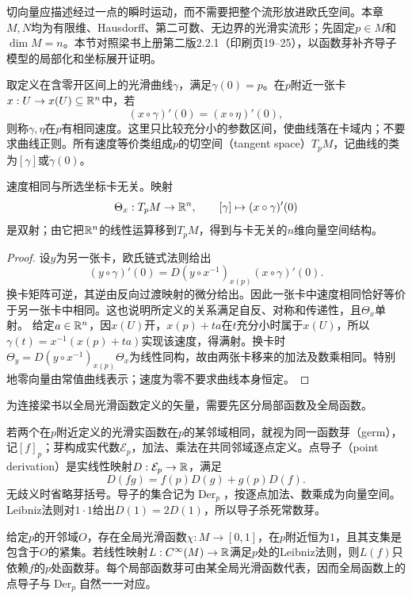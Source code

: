 切向量应描述经过一点的瞬时运动，而不需要把整个流形放进欧氏空间。本章$M,N$均为有限维、Hausdorff、第二可数、无边界的光滑实流形；先固定$p\in M$和$\dim M=n$。本节对照梁书上册第二版2.2.1（印刷页19--25），以函数芽补齐导子模型的局部化和坐标展开证明。
\begin{definition}[曲线的速度等价类]
取定义在含零开区间上的光滑曲线$\gamma$，满足$\gamma(0)=p$。在$p$附近一张卡$x:U\to x(U)\subseteq\mathbb{R}^n$中，若
\[
 (x\circ\gamma)'(0)=(x\circ\eta)'(0),
\]
则称$\gamma,\eta$在$p$有相同速度。这里只比较充分小的参数区间，使曲线落在卡域内；不要求曲线正则。所有速度等价类组成$p$的切空间（tangent space）$T_pM$，记曲线的类为$[\gamma]$或$\dot\gamma(0)$。
\end{definition}
\begin{theorem}[曲线模型的坐标无关性]\label{thm:tangent-curves}
速度相同与所选坐标卡无关。映射
\[
 \Theta_x:T_pM\to\mathbb{R}^n,\qquad [\gamma]\mapsto(x\circ\gamma)'(0)
\]
是双射；由它把$\mathbb{R}^n$的线性运算移到$T_pM$，得到与卡无关的$n$维向量空间结构。
\end{theorem}
\begin{proof}
设$y$为另一张卡，欧氏链式法则给出
\[
 (y\circ\gamma)'(0)=D(y\circ x^{-1})_{x(p)}(x\circ\gamma)'(0).
\]
换卡矩阵可逆，其逆由反向过渡映射的微分给出。因此一张卡中速度相同恰好等价于另一张卡中相同。这也说明所定义的关系满足自反、对称和传递性，且$\Theta_x$单射。
给定$a\in\mathbb{R}^n$，因$x(U)$开，$x(p)+ta$在$t$充分小时属于$x(U)$，所以$\gamma(t)=x^{-1}(x(p)+ta)$实现该速度，得满射。换卡时$\Theta_y= D(y\circ x^{-1})_{x(p)}\Theta_x$为线性同构，故由两张卡移来的加法及数乘相同。特别地零向量由常值曲线表示；速度为零不要求曲线本身恒定。
\end{proof}
为连接梁书以全局光滑函数定义的矢量，需要先区分局部函数及全局函数。
\begin{definition}[函数芽与点导子]
若两个在$p$附近定义的光滑实函数在$p$的某邻域相同，就视为同一函数芽（germ），记$[f]_p$；芽构成实代数$\mathcal E_p$，加法、乘法在共同邻域逐点定义。点导子（point derivation）是实线性映射$D:\mathcal E_p\to\mathbb{R}$，满足
\[
 D(fg)=f(p)D(g)+g(p)D(f).
\]
无歧义时省略芽括号。导子的集合记为$\operatorname{Der}_p$，按逐点加法、数乘成为向量空间。Leibniz法则对$1\cdot1$给出$D(1)=2D(1)$，所以导子杀死常数芽。
\end{definition}
\begin{lemma}[局部光滑截断与全局导子的局部性]\label{lem:tangent-locality}
给定$p$的开邻域$O$，存在全局光滑函数$\chi:M\to[0,1]$，在$p$附近恒为$1$，且其支集是包含于$O$的紧集。若线性映射$L:C^\infty(M)\to\mathbb{R}$满足$p$处的Leibniz法则，则$L(f)$只依赖$f$的$p$处函数芽。每个局部函数芽可由某全局光滑函数代表，因而全局函数上的点导子与$\operatorname{Der}_p$自然一一对应。
\end{lemma}

